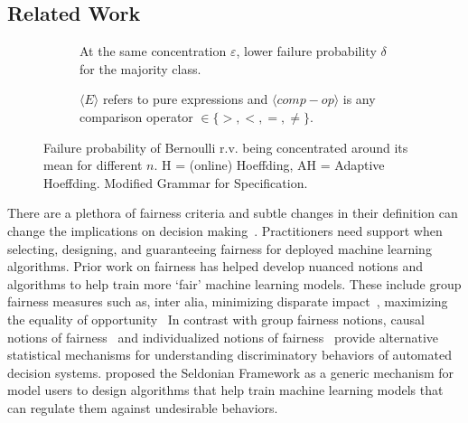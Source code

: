 \subsection{Related Work}
\label{sec:related}

\begin{figure}[ht]
    \centering
    \begin{subfigure}[b]{0.47\linewidth}
        \resizebox{\linewidth}{!}{
            \centering
            
        }
        \caption{At the same concentration $\varepsilon$, lower failure probability $\delta$ for the majority class.}
        \label{fig:n-comparison-hoeffding}
    \end{subfigure}
    \hfill
    \begin{subfigure}[b]{0.48\linewidth}
        \centering
           
         \caption{ $\langle E \rangle$ refers to pure expressions and $\langle comp-op \rangle$ is any comparison operator $\in \{>, <, =, \neq\}$.}
         \label{fig:grammar}
    \end{subfigure}
    \caption{\figleft{} Failure probability of Bernoulli r.v. being concentrated around its mean for different $n$. H = (online) Hoeffding, AH = Adaptive Hoeffding. \figright{} Modified Grammar for Specification.}
\end{figure}

There are a plethora of fairness criteria and subtle changes in their definition can change the implications on decision making~\citep{castelnovo2021zoo}.
Practitioners need support when selecting, designing, and guaranteeing fairness for deployed machine learning algorithms.
Prior work on fairness has helped develop nuanced notions and algorithms to help train more `fair' machine learning models.
These include group fairness measures such as, inter alia, minimizing disparate impact~\citep{calders2009building,feldman2015certifying}, maximizing the equality of opportunity~\citep{hardt2016equality}
In contrast with group fairness notions, causal notions of fairness~\cite{kusner2017counterfactual} and individualized notions of fairness~\cite{dwork2012fairness} provide alternative statistical mechanisms for understanding discriminatory behaviors of automated decision systems.
\citet{thomas2019preventing} proposed the Seldonian Framework as a generic mechanism for model users to design algorithms that help train machine learning models that can regulate them against undesirable behaviors.

